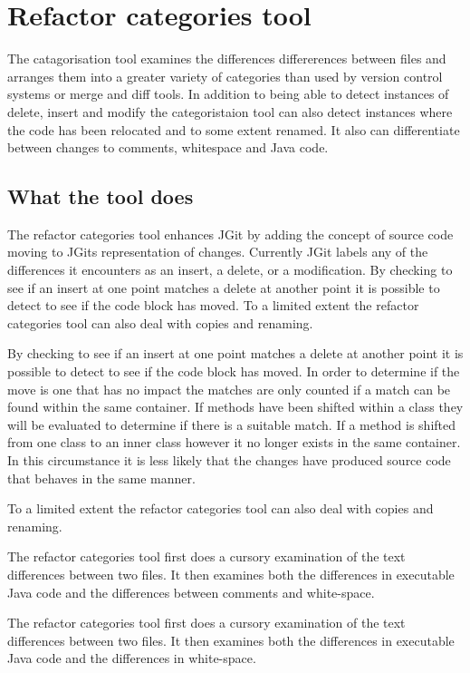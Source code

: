 
\chapter{Refactor categories tool}

The catagorisation tool examines the differences differerences between files and arranges them into a greater variety of categories than used by version control systems or merge and diff tools.  In addition to being able to detect instances of delete, insert and modify the categoristaion tool can also detect instances where the code has been relocated and to some extent renamed.  It also can differentiate between changes to comments, whitespace and Java code.

\section{What the tool does}
The refactor categories tool enhances JGit by adding the concept of source code moving to JGits representation of changes.
Currently JGit labels any of the differences it encounters as an insert, a delete, or a modification.  By checking to see if an insert at one point matches a delete at another point it is possible to detect to see if the code block has moved.
To a limited extent the refactor categories tool can also deal with copies and renaming.

By checking to see if an insert at one point matches a delete at another point it is possible to detect to see if the code block has moved. In order to determine if the move is one that has no impact the matches are only counted if a match can be found within the same container.  If methods have been shifted within a class they will be evaluated to determine if there is a suitable match.  If a method is shifted from one class to an inner class however it no longer exists in the same container.  In this circumstance it is less likely that the changes have produced source code that behaves in the same manner.

To a limited extent the refactor categories tool can also deal with copies and renaming.

The refactor categories tool first does a cursory examination of the text differences between two files. It then examines both the differences in executable Java code and the differences between comments and white-space. 


The refactor categories tool first does a cursory examination of the text differences between two files. It then examines both the differences in executable Java code and the differences in white-space.



